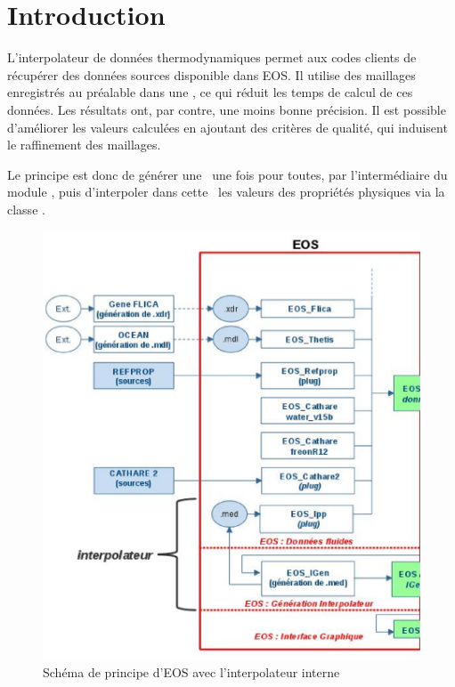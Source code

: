 \chapter{Introduction}
L'interpolateur de données thermodynamiques permet aux codes clients de récupérer des données sources disponible dans EOS.
Il utilise des maillages enregistrés au préalable dans une \bdd, ce qui réduit les temps de calcul de ces données.
Les résultats ont, par contre, une moins bonne précision. Il est possible d'améliorer les valeurs calculées en ajoutant des critères de qualité,
qui induisent le raffinement des maillages.

\smallbreak
\vspace{0.3cm}
Le principe est donc de générer une \bdd\ une fois pour toutes, par l'intermédiaire du module \IGEN, puis d'interpoler dans cette 
\bdd\ les valeurs des propriétés physiques via la classe \IPP.

\begin{figure}[H]
    \center
    \includegraphics[width=1\textwidth]{EOS_interpolateur.eps}
    \caption{Schéma de principe d'EOS avec l'interpolateur interne}\label{figeos}
\end{figure}
  

